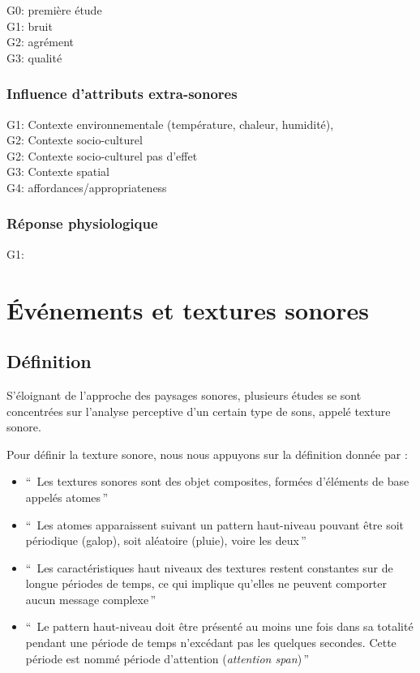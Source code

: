 G0: \citep{defreville2004aactivity} première étude\\
G1: \citep{marquis2015simulated} bruit\\
G2:  \citep{lavandier2006contribution,guillen2007importance} agrément\\
G3:  \citep{nilsson2007soundscape,ricciardi2015sound} qualité

\subsubsection{Influence d'attributs extra-sonores}

G1: Contexte environnementale (température, chaleur, humidité), \citep{meng2013field,jeon2011non} \\
G2: Contexte socio-culturel \citep{hall2013exploratory,yu2010factors}\\
G2: Contexte socio-culturel \citep{guillen2007importance} pas d'effet\\
G3: Contexte spatial \citep{hall2013exploratory}\\
G4: affordances/appropriateness \citep{hall2013exploratory}

\subsubsection{Réponse physiologique}

G1: \citep{hume2013physiological}

\section{Événements et textures sonores}
\label{sec:ch3_eventTexture}

\subsection{Définition}

S'éloignant de l'approche des paysages sonores, plusieurs études se sont concentrées sur l'analyse perceptive d'un certain type de sons, appelé texture sonore.

Pour définir la texture sonore, nous nous appuyons sur la définition donnée par \citep[p. 25]{saint1995classification}:  

\begin{itemize}
\item ``\, Les textures sonores sont des objet composites, formées d'éléments de base appelés atomes\,''
\item ``\, Les atomes apparaissent suivant un pattern haut-niveau pouvant être soit périodique (galop), soit aléatoire (pluie), voire les deux\,''
\item ``\, Les caractéristiques haut niveaux des textures restent constantes sur de longue périodes de temps, ce qui implique qu'elles ne peuvent comporter aucun message complexe\,''
\item ``\, Le pattern haut-niveau doit être présenté au moins une fois dans sa totalité pendant une période de temps n’excédant pas les quelques  secondes. Cette période est nommé période d'attention (\emph{attention span})\,''
\end{itemize}

